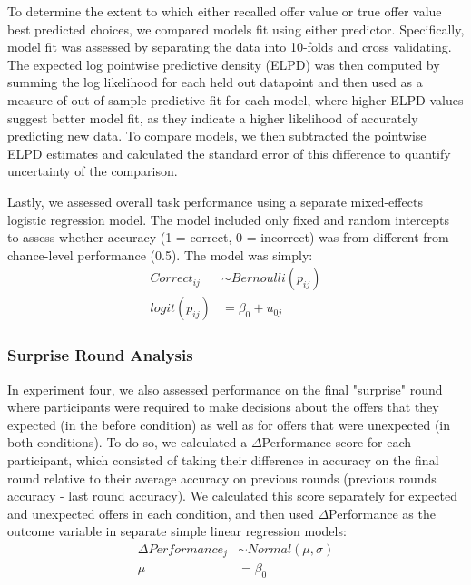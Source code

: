 \documentclass[10pt,letterpaper]{article}
\begin{document}
To determine the extent to which either recalled offer value or true offer value best predicted choices, we compared models fit using either predictor. Specifically, model fit was assessed by separating the data into 10-folds and cross validating. The expected log pointwise predictive density (ELPD) was then computed by summing the log likelihood for each held out datapoint and then used as a measure of out-of-sample predictive fit for each model, where higher ELPD values suggest better model fit, as they indicate a higher likelihood of accurately predicting new data. To compare models, we then subtracted the pointwise ELPD estimates and calculated the standard error of this difference to quantify uncertainty of the comparison\cite{vehtariPracticalBayesianModel2017, sivulaUncertaintyBayesianLeaveOneOut2023}.

Lastly, we assessed overall task performance using a separate mixed-effects logistic regression model. The model included only fixed and random intercepts to assess whether accuracy (1 = correct, 0 = incorrect) was from different from chance-level performance (0.5). The model was simply:
\begin{align*}
Correct_{ij} &\sim Bernoulli(p_{ij}) \\
logit(p_{ij}) &= \beta_0 + u_{0j}
\end{align*}

\subsubsection{Surprise Round Analysis}

In experiment four, we also assessed performance on the final "surprise" round where participants were required to make decisions about the offers that they expected (in the before condition) as well as for offers that were unexpected (in both conditions). To do so, we calculated a $\Delta$Performance score for each participant, which consisted of taking their difference in accuracy on the final round relative to their average accuracy on previous rounds (previous rounds accuracy - last round accuracy). We calculated this score separately for expected and unexpected offers in each condition, and then used $\Delta$Performance as the outcome variable in separate simple linear regression models:
\begin{align*}
\Delta Performance_{j} &\sim Normal(\mu, \sigma) \\
\mu &= \beta_0
\end{align*}
\end{document}
